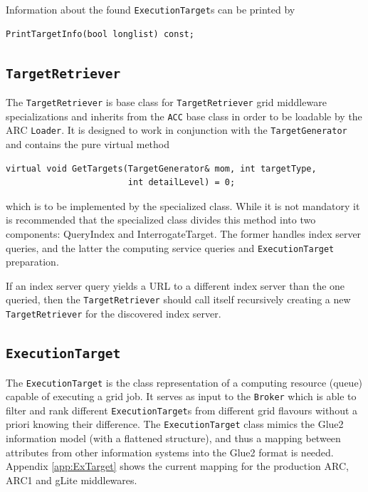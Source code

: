 \documentclass{book}
\newcommand{\ACC}{\texttt{ACC}}
\newcommand{\Broker}{\texttt{Broker}}
\newcommand{\ExecutionTarget}{\texttt{ExecutionTarget}}
\newcommand{\TargetGenerator}{\texttt{TargetGenerator}}
\newcommand{\TargetRetriever}{\texttt{TargetRetriever}}
\begin{document}
Information about the found {\ExecutionTarget}s can be printed by 

\begin{shaded}
\begin{verbatim}
PrintTargetInfo(bool longlist) const;
\end{verbatim}
\end{shaded}

\subsection{{\TargetRetriever}}

The {\TargetRetriever} is base class for {\TargetRetriever} grid
middleware specializations and inherits from the {\ACC} base class in
order to be loadable by the ARC \texttt{Loader}. It is designed to
work in conjunction with the {\TargetGenerator} and contains the pure
virtual method

\begin{shaded}
\begin{verbatim}
virtual void GetTargets(TargetGenerator& mom, int targetType,
                        int detailLevel) = 0;
\end{verbatim}
\end{shaded}

which is to be implemented by the specialized class. While it is not
mandatory it is recommended that the specialized class divides this
method into two components: QueryIndex and InterrogateTarget. The
former handles index server queries, and the latter the computing
service queries and {\ExecutionTarget} preparation.

If an index server query yields a URL to a different index server
than the one queried, then the {\TargetRetriever} should call itself
recursively creating a new {\TargetRetriever} for the discovered index
server.

\subsection{{\ExecutionTarget}}

The {\ExecutionTarget} is the class representation of a computing
resource (queue) capable of executing a grid job. It serves as input
to the {\Broker} which is able to filter and rank different 
{\ExecutionTarget}s from different grid flavours without a
priori knowing their difference. The {\ExecutionTarget} class mimics
the Glue2 information model (with a flattened structure), and thus a
mapping between attributes from other information systems into the
Glue2 format is needed. Appendix \ref{app:ExTarget} shows the current
mapping for the production ARC, ARC1 and gLite middlewares.
\end{document}
